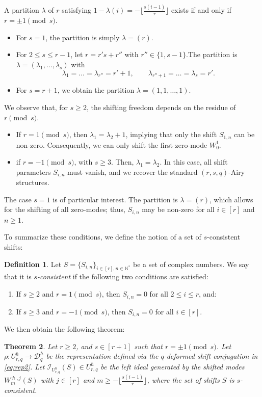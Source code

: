 \documentclass[reqno,11pt]{amsart}
\theoremstyle{plain}
\newtheorem{theorem}{Theorem}[section]
\theoremstyle{definition}
\newtheorem{definition}[theorem]{Definition}
\theoremstyle{remark}
\numberwithin{equation}{section}
\newcommand{\1}{\mathds{1}}
\newcommand{\2}{\frac{1}{2}}
\begin{document}
{				A partition  $\lambda$ of $r$ satisfying $1-\lambda(i) = - \lfloor \frac{s(i-1)}{r} \rfloor$ exists if and only if $r = \pm 1 \pmod{s}$. 
				\begin{itemize}
					\item 
					For $s=1$, the partition is simply $\lambda=(r)$. 
					\item For $2 \leq s \leq r-1$,  let $r = r' s + r''$ with $r'' \in \{1, s-1\}$.The partition is $\lambda = (\lambda_1,\ldots, \lambda_s)$ with
					\begin{equation}
						\lambda_1 = \ldots = \lambda_{r''} = r'+1, \qquad \lambda_{r''+1} = \ldots = \lambda_s = r'.
					\end{equation}
					\item For $s=r+1$, we obtain the partition  $\lambda = (1,1,\ldots,1)$.
				\end{itemize}
				We observe that, for $s \geq 2$, the shifting freedom depends on the residue of $r\pmod{s}$.
				\begin{itemize}
					\item
					If $r= 1 \pmod{s}$, then $\lambda_1 = \lambda_2+1$, implying that only the shift $S_{1,n}$ can be non-zero. Consequently, we can only shift the first zero-mode $W^1_0$. 
					\item if $r=-1 \pmod{s}$, with $s \geq 3$. Then,  $\lambda_1 = \lambda_2$. In this case, all shift parameters $S_{i,n}$ must vanish, and we recover the standard  $(r,s,q)$-Airy structures. 
				\end{itemize}
				The case $s=1$ is of particular interest. The partition is $\lambda = (r)$, which allows for the shifting of all zero-modes; thus, $S_{i,n}$ may be non-zero  for all $i \in [r]$ and $n \geq 1$. 
				
				To summarize these conditions, we define the notion of a set of $s$-consistent shifts:
				\begin{definition}\label{d:consistent}
					Let $S=\{ S_{i,n} \}_{i \in [r], n \in \mathbb{N}^*}$ be a set of complex numbers. We say that it is \emph{$s$-consistent} if the following two conditions are satisfied:
					\begin{enumerate}
						\item[(a)] If $s \geq 2$ and $r = 1 \pmod{s}$, then $S_{i,n} = 0$ for all $2 \leq i \leq r$, and:
						\item[(b)] If $s \geq 3$ and $r = -1 \pmod{s}$, then $S_{i,n} = 0$ for all $i \in [r]$.
					\end{enumerate}
				\end{definition}
				We then obtain the following theorem:
				\begin{theorem}\label{t:shifts}
					Let $ r \geq 2$, and $ s \in [r+1]$ such that $ r = \pm 1 \pmod{s}$. Let $\rho: U^\hslash_{r,q} \to \mathcal{D}_{q}^\hslash$ be the representation defined via the $q$-deformed shift conjugation in \eqref{eq:rep2}. Let $\mathcal{I}_{U_{r,q}^\hslash}(S) \in U^\hslash_{r,q}$ be the left ideal generated by the shifted modes $W^{\hslash,j}_m(S)$ with $j \in [r]$ and $m \geq - \lfloor \frac{s(i-1)}{r} \rfloor $, where the set of shifts $S$ is $s$-consistent.
					

\end{theorem}}
\end{document}

